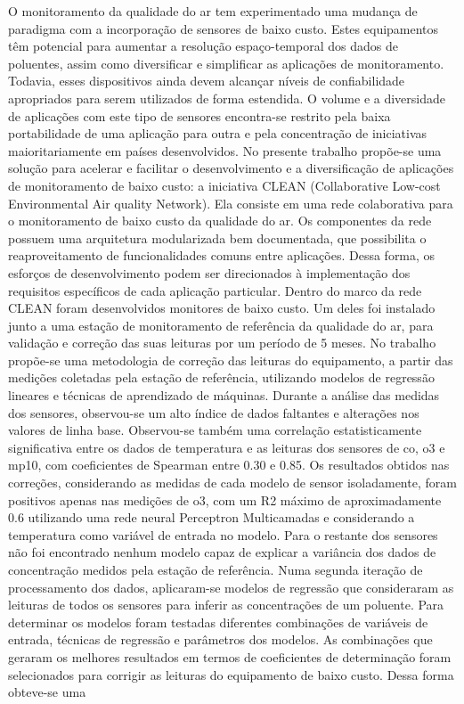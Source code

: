 
\setlength{\absparsep}{18pt} %
\begin{resumo}
	\SingleSpacing
	O monitoramento da qualidade do ar tem experimentado uma mudança de paradigma com a incorporação de sensores de baixo custo. Estes equipamentos têm potencial para aumentar a resolução espaço-temporal dos dados de poluentes, assim como diversificar e simplificar as aplicações de monitoramento. Todavia, esses dispositivos ainda devem alcançar níveis de confiabilidade apropriados para serem utilizados de forma estendida. O volume e a diversidade de aplicações com este tipo de sensores encontra-se restrito pela baixa portabilidade de uma aplicação para outra e pela concentração de iniciativas maioritariamente em países desenvolvidos. No presente trabalho propõe-se uma solução para acelerar e facilitar o desenvolvimento e a diversificação de aplicações de monitoramento de baixo custo: a iniciativa CLEAN (Collaborative Low-cost Environmental Air quality Network). Ela consiste em uma rede colaborativa para o monitoramento de baixo custo da qualidade do ar. Os componentes da rede possuem uma arquitetura modularizada bem documentada, que possibilita o reaproveitamento de funcionalidades comuns entre aplicações. Dessa forma, os esforços de desenvolvimento podem ser direcionados à implementação dos requisitos específicos de cada aplicação particular. Dentro do marco da rede CLEAN foram desenvolvidos monitores de baixo custo. Um deles foi instalado junto a uma estação de monitoramento de referência da qualidade do ar, para validação e correção das suas leituras por um período de 5 meses. No trabalho propõe-se uma metodologia de correção das leituras do equipamento, a partir das medições coletadas pela estação de referência, utilizando modelos de regressão lineares e técnicas de aprendizado de máquinas. Durante a análise das medidas dos sensores, observou-se um alto índice de dados faltantes e alterações nos valores de linha base. Observou-se também uma correlação estatisticamente significativa entre os dados de temperatura e as leituras dos sensores de \acrshort{co}, \acrshort{o3} e \acrshort{mp10}, com coeficientes de Spearman entre 0.30 e 0.85. Os resultados obtidos nas correções, considerando as medidas de cada modelo de sensor isoladamente, foram positivos apenas nas medições de \acrshort{o3}, com um R2 máximo de aproximadamente 0.6 utilizando uma rede neural Perceptron Multicamadas e considerando a temperatura como variável de entrada no modelo. Para o restante dos sensores não foi encontrado nenhum modelo capaz de explicar a variância dos dados de concentração medidos pela estação de referência. Numa segunda iteração de processamento dos dados, aplicaram-se modelos de regressão que consideraram as leituras de todos os sensores para inferir as concentrações de um poluente. Para determinar os modelos foram testadas diferentes combinações de variáveis de entrada, técnicas de regressão e parâmetros dos modelos. As combinações que geraram os melhores resultados em termos de coeficientes de determinação foram selecionados para corrigir as leituras do equipamento de baixo custo. Dessa forma obteve-se uma 
\end{resumo}
